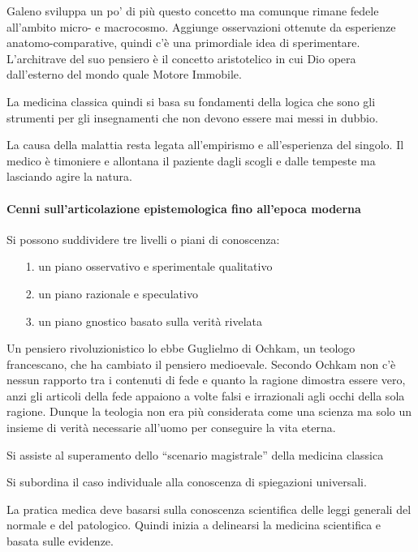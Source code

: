   Galeno sviluppa un po' di più questo concetto ma comunque rimane
  fedele all'ambito micro- e macrocosmo. Aggiunge osservazioni ottenute
  da esperienze anatomo-comparative, quindi c'è una primordiale idea di
  sperimentare. L'architrave del suo pensiero è il concetto aristotelico
  in cui Dio opera dall'esterno del mondo quale Motore Immobile.

  La medicina classica quindi si basa su fondamenti della logica che
  sono gli strumenti per gli insegnamenti che non devono essere mai
  messi in dubbio.

  La causa della malattia resta legata all'empirismo e all'esperienza
  del singolo. Il medico è timoniere e allontana il paziente dagli
  scogli e dalle tempeste ma lasciando agire la natura.

  \paragraph{Cenni sull'articolazione epistemologica fino all'epoca moderna}

  Si possono suddividere tre livelli o piani di conoscenza:
  
\begin{itemize}
\item[1.]
  un piano osservativo e sperimentale qualitativo
\item[2.]
  un piano razionale e speculativo
\item[3.]
  un piano gnostico basato sulla verità rivelata
\end{itemize}

  Un pensiero rivoluzionistico lo ebbe Guglielmo di Ochkam, un teologo
  francescano, che ha cambiato il pensiero medioevale. Secondo Ochkam
  non c'è nessun rapporto tra i contenuti di fede e quanto la ragione
  dimostra essere vero, anzi gli articoli della fede appaiono a volte
  falsi e irrazionali agli occhi della sola ragione. Dunque la teologia
  non era più considerata come una scienza ma solo un insieme di verità
  necessarie all'uomo per conseguire la vita eterna.

  Si assiste al superamento dello ``scenario magistrale'' della medicina
  classica

  Si subordina il caso individuale alla conoscenza di spiegazioni
  universali.

  La pratica medica deve basarsi sulla conoscenza scientifica delle
  leggi generali del normale e del patologico. Quindi inizia a
  delinearsi la medicina scientifica e basata sulle evidenze.

